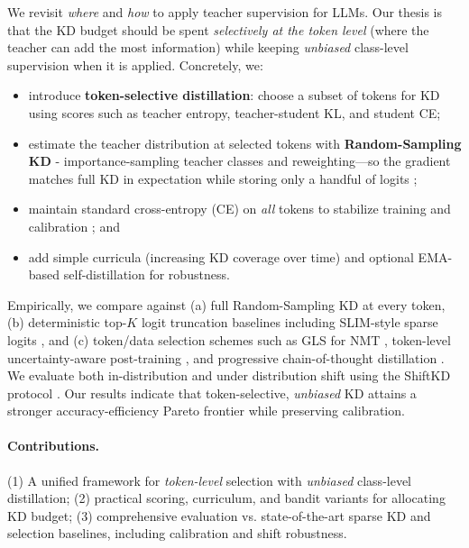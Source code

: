 \documentclass[11pt]{article}
\begin{document}
We revisit \emph{where} and \emph{how} to apply teacher supervision for LLMs. Our thesis is that the KD budget should be spent \emph{selectively at the token level} (where the teacher can add the most information) while keeping \emph{unbiased} class-level supervision when it is applied. Concretely, we:

\begin{itemize}
\item introduce \textbf{token-selective distillation}: choose a subset of tokens for KD using scores such as teacher entropy, teacher-student KL, and student CE;
\item estimate the teacher distribution at selected tokens with \textbf{Random-Sampling KD} - importance-sampling teacher classes and reweighting—so the gradient matches full KD in expectation while storing only a handful of logits \citep{anshumann2025sparse};
\item maintain standard cross-entropy (CE) on \emph{all} tokens to stabilize training and calibration \citep{guo2017calibration}; and
\item add simple curricula (increasing KD coverage over time) and optional EMA-based self-distillation for robustness.
\end{itemize}

Empirically, we compare against (a) full Random-Sampling KD at every token, (b) deterministic top-$K$ logit truncation baselines including SLIM-style sparse logits \citep{raman2023slim}, and (c) token/data selection schemes such as GLS for NMT \citep{wang2021selectivekd}, token-level uncertainty-aware post-training \citep{liu2025tokenlevel}, and progressive chain-of-thought distillation \citep{feng2024kpod}. We evaluate both in-distribution and under distribution shift using the ShiftKD protocol \citep{zhang2023shiftkd}. Our results indicate that token-selective, \emph{unbiased} KD attains a stronger accuracy-efficiency Pareto frontier while preserving calibration.

\paragraph{Contributions.} (1) A unified framework for \emph{token-level} selection with \emph{unbiased} class-level distillation; (2) practical scoring, curriculum, and bandit variants for allocating KD budget; (3) comprehensive evaluation vs. state-of-the-art sparse KD and selection baselines, including calibration and shift robustness.
\end{document}
